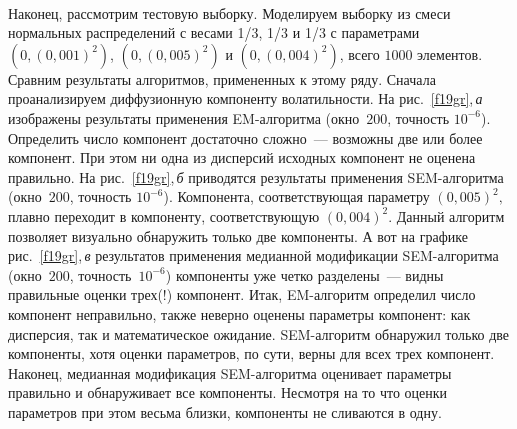 \begin{multicols}{2}
\begin{figure*}
\vspace*{1pt}
\begin{center}
\mbox{%
\epsfxsize=117.019mm
}
\end{center}
\vspace*{-9pt}
\end{figure*}


Наконец, рассмотрим тестовую выборку. Моделируем выборку из смеси
нормальных распределений с весами 1/3, 1/3 и
1/3 с параметрами $(0,\left( 0{,}001\right)^{2})$,
$(0,\left( 0{,}005\right)^{2})$ и $(0,\left( 0{,}004\right)^{2})$,
всего $1000$ элементов. Сравним результаты алгоритмов, примененных
к этому ряду. Сначала проанализируем диффузионную компоненту
волатильности.  На рис.~\ref{f19gr},\,\textit{а} изображены результаты
применения EM-ал\-го\-рит\-ма (окно~$200$, точность $10^{-6}$).
Определить число компонент достаточно сложно~--- возможны две или
более компонент. При этом ни одна из дисперсий исходных компонент
не оценена правильно. На рис.~\ref{f19gr},\,\textit{б} приводятся
результаты применения SEM-ал\-го\-рит\-ма (окно~$200$, точность
$10^{-6}$). Компонента, соответствующая параметру
$\left(0{,}005\right)^{2},$ плавно переходит в компоненту,
соответствующую $\left(0{,}004\right)^{2}$. Данный алгоритм
позволяет визуально обнаружить только две компоненты. А вот на
графике рис.~\ref{f19gr},\,\textit{в} результатов применения медианной
модификации SEM-ал\-го\-рит\-ма (окно~$200$, точность~$10^{-6}$)
компоненты уже четко разделены~--- видны правильные оценки трех(!)
компонент. Итак, EM-ал\-го\-ритм определил число компонент
неправильно, также неверно оценены параметры компонент: как
дисперсия, так и математическое ожидание. SEM-алгоритм обнаружил
только две компоненты, хотя оценки параметров, по сути, верны для
всех трех компонент. Наконец, медианная модификация SEM-алгоритма
оценивает параметры правильно и обнаруживает все компоненты.
Несмотря на то что оценки параметров при этом весьма близки,
компоненты не сливаются в одну.

\begin{figure*}
\vspace*{1pt}
\begin{center}
\mbox{%
\epsfxsize=115.858mm
}
\end{center}
\vspace*{-9pt}
\end{figure*}



\end{multicols}

